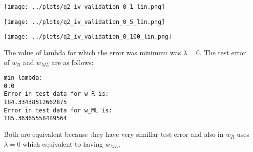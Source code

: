\begin{center}
	\texttt{[image: ../plots/q2\_iv\_validation\_0\_1\_lin.png]}	
\end{center}

\begin{center}
	\texttt{[image: ../plots/q2\_iv\_validation\_0\_5\_lin.png]}	
\end{center}

\begin{center}
	\texttt{[image: ../plots/q2\_iv\_validation\_0\_100\_lin.png]}	
\end{center}

The value of lambda for which the error was minimum was $\lambda = 0$. The test error of $w_R$ and $w_{ML}$ are as follows:

\begin{verbatim}
min lambda:
0.0
Error in test data for w_R is:
184.33438512662875
Error in test data for w_ML is:
185.36365558489564	
\end{verbatim}

Both are equivalent because they have very simillar test error and also in $w_R$ uses $\lambda = 0$ which equivalent to having $w_{ML}$.

